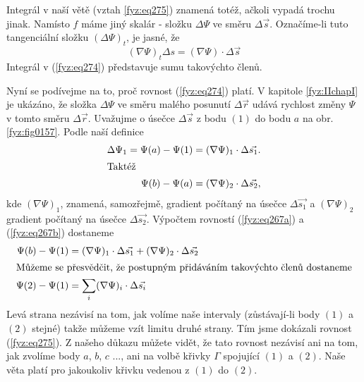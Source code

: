     Integrál v naší větě (vztah \ref{fyz:eq275}) znamená totéž, ačkoli vypadá trochu jinak. Namísto 
    \(f\) máme jiný skalár - složku \(\Delta\Psi\) ve směru \(\Delta\vec{s}\). Označíme-li tuto 
    tangenciální složku \((\Delta\Psi)_t\), je jasné, že
    \begin{equation}\label{fyz:eq274}
      (\nabla\Psi)_t\Delta s = (\nabla\Psi)\cdot\Delta\vec{s}
    \end{equation}
    Integrál v (\ref{fyz:eq274}) představuje sumu takovýchto členů.
    
    Nyní se podívejme na to, proč rovnost (\ref{fyz:eq274}) platí. V kapitole   
    \ref{fyz:IIchapI} je ukázáno, že složka \(\Delta\Psi\) ve směru malého posunutí 
    \(\Delta\vec{r}\) udává rychlost změny \(\Psi\) v tomto směru \(\Delta\vec{r}\). Uvažujme o 
    úsečce \(\Delta\vec{s}\) z bodu \((1)\) do bodu \(a\) na obr. \ref{fyz:fig0157}. Podle 
    naší definice  
    \begin{align}
     \Delta\Psi_1 = \Psi(a) - \Psi(1) 
       &= (\nabla\Psi)_1\cdot\Delta\vec{s_1}.         \label{fyz:eq267a}  \\
     \shortintertext{Taktéž}
     \Psi(b) - \Psi(a)
       &= (\nabla\Psi)_2\cdot\Delta\vec{s_2},         \label{fyz:eq267b}
    \end{align}
    kde \((\nabla\Psi)_1\), znamená, samozřejmě, gradient počítaný na úsečce \(\Delta\vec{s_1}\) a 
    \((\nabla\Psi)_2\) gradient počítaný na úsečce \(\Delta\vec{s_2}\). Výpočtem rovností 
    (\ref{fyz:eq267a}) a (\ref{fyz:eq267b}) dostaneme
    \begin{align}
     \Psi(b) - \Psi(1)              &= 
        (\nabla\Psi)_1\cdot\Delta\vec{s_1} + 
        (\nabla\Psi)_2\cdot\Delta\vec{s_2}               \label{fyz:eq268a} \\
     \shortintertext{Můžeme se přesvědčit, že postupným přidáváním takovýchto členů dostaneme}
     \Psi(2) - \Psi(1)              &= 
       \sum_i(\nabla\Psi)_i\cdot\Delta\vec{s_i}          \label{fyz:eq268b}
    \end{align}
    Levá strana nezávisí na tom, jak volíme naše intervaly (zů\-stá\-va\-jí-li body \((1)\) a 
    \((2)\) stejné) takže můžeme vzít limitu druhé strany. Tím jsme dokázali rovnost 
    (\ref{fyz:eq275}). Z našeho důkazu můžete vidět, že tato rovnost nezávisí ani na 
    tom, jak zvolíme body \(a\), \(b\), \(c\) ..., ani na volbě křivky \(\Gamma\) spojující \((1)\) 
    a \((2)\). Naše věta platí pro jakoukoliv křivku vedenou z \((1)\) do \((2)\).
    
